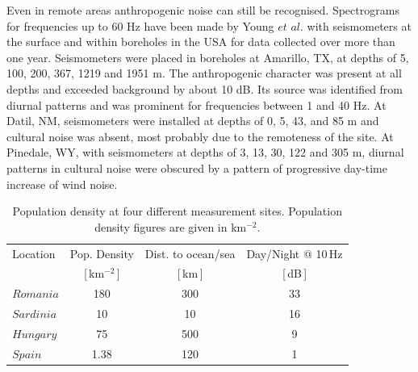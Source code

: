 Even in remote areas anthropogenic noise can still be recognised. Spectrograms for frequencies up to 60 Hz have been made by Young $et$ $al.$ \cite{Young1996} with seismometers at the surface and within boreholes in the USA for data collected over more than one year. Seismometers were placed in boreholes at Amarillo, TX, at depths of 5, 100, 200, 367, 1219 and 1951 m. The anthropogenic character was present at all depths and exceeded background by about 10 dB. Its source was identified from diurnal patterns and was prominent for frequencies between 1 and 40 Hz. At Datil, NM, seismometers were installed at depths of 0, 5, 43, and 85 m and cultural noise was absent, most probably due to the remoteness of the site. At Pinedale, WY, with seismometers at depths of 3, 13, 30, 122 and 305 m, diurnal patterns in cultural noise were obscured by a pattern of progressive day-time increase of wind noise. 
\begin{table}[h] 
		\centering      %
		\caption{Population density at four different measurement sites. Population density figures are given in km$^{-2}$.} 
		\setlength{\tabcolsep}{10pt} 
			\begin{tabular}{l c c c}  %
			\hline\hline                        %
			Location & Pop. Density & Dist. to ocean/sea & Day/Night @ 10\,Hz \\  %
			& [\,km$^{-2}$\,] & [\,km\,] & [\,dB\,] \\ [0.5ex]
			\hline                    %
			$Romania$ & 180 & 300 & 33  \\   %
			$Sardinia$ & 10 & 10 & 16 \\ 
			$Hungary$ & 75 & 500 & 9 \\        %
			$Spain$ & 1.38 & 120& 1 \\ [1ex]       %
			\hline     %
			\end{tabular} 
		\label{PopDens}
\end{table} 

